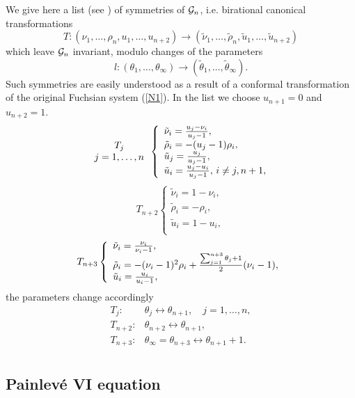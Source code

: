 \documentclass[12pt]{article}
\theoremstyle{definition}
\theoremstyle{theorem}
\begin{document}
We give here a list (see \cite{IKSY}) of symmetries of ${\cal G}_n$, 
i.e. birational canonical transformations
$$
T:(\nu_1,\dots,\rho_{n},u_1,\dots,u_{n+2})\to
(\tilde\nu_1,\dots,\tilde\rho_{n},\tilde u_1,\dots,\tilde u_{n+2})
$$
which leave ${\cal G}_n$ invariant, modulo changes of the parameters
$$
l:(\theta_1,\dots,\theta_\infty)\to
(\tilde\theta_1,\dots,\tilde\theta_\infty).
$$
Such symmetries are easily understood as a result of a conformal
transformation of the original Fuchsian system (\ref{N1}). In the list
we choose $u_{n+1}=0$ and $u_{n+2}=1$.
$$
\begin{array}{c}
T_j\\
j=1,\dots,n\\
\end{array}
\left\{
\begin{array}{l}
\tilde\nu_i={u_j-\nu_i\over u_j-1},\\
\tilde\rho_i=-(u_j-1)\rho_i,\\
\tilde u_j={u_j\over u_j-1},\\
\tilde u_i={u_j-u_i\over u_j-1},\, i\neq j,n+1,\\
\end{array}\right.
$$
$$
T_{n+2}
\left\{
\begin{array}{l}
\tilde\nu_i=1-\nu_i,\\
\tilde\rho_i=-\rho_i,\\
\tilde u_i=1-u_i,\\
\end{array}\right.
$$
$$
T_{n+3}
\left\{
\begin{array}{l}
\tilde\nu_i={\nu_i\over\nu_i-1},\\
\tilde\rho_i=-(\nu_i-1)^2\rho_i+
{\sum_{j=1}^{n+3}\theta_j+1\over2}(\nu_i-1),\\
\tilde u_i={u_i\over u_i-1},\\
\end{array}\right.
$$
the parameters change accordingly
$$
\begin{array}{ll}
T_j:&\theta_j\leftrightarrow\theta_{n+1},\quad j=1,\dots,n,\\
T_{n+2}:&\theta_{n+2}\leftrightarrow\theta_{n+1},\\
T_{n+3}:&\theta_\infty=\theta_{n+3}\leftrightarrow\theta_{n+1}+1.\\
\end{array}
$$





\subsection{Painlev\'e VI equation}
\end{document}
